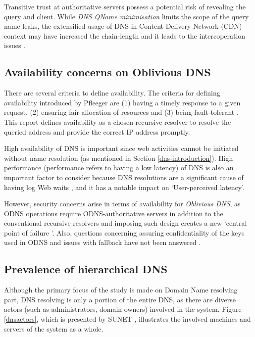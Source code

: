 Transitive trust at authoritative servers possess a potential risk of revealing the query and client. While \textit{DNS QName minimisation} \cite{bortzmeyer2016dns} limits the scope of the query name leaks, the extensified usage of DNS in Content Delivery Network (CDN) context \cite{WANG2018235} may have increased the chain-length and it leads to the intercoperation issues \cite{Huque-QNAME-Min-analysis}.

\subsection{Availability concerns on Oblivious DNS}
There are several criteria to define availability. The criteria for defining availability introduced by Pfleeger are (1) having a timely response to a given request, (2) ensuring fair allocation of resources and (3) being fault-tolerant \cite{securityincomputing}.
This report defines availability as a chosen recursive resolver to resolve the queried address and provide the correct IP address promptly.

High availability of DNS is important since web activities cannot be initiated without name resolution (as mentioned in Section \ref{dns-introduction}). High performance (performance refers to having a low latency) of DNS is also an important factor to consider because DNS resolutions are a significant cause of having log Web waits \cite{cohen2003proactive, jung2002dns}, and it has a notable impact on `User-perceived latency'.

However, security concerns arise in terms of availability for \textit{Oblivious DNS}, as ODNS operations require ODNS-authoritative servers in addition to the conventional recursive resolvers and imposing such design creates a new `central point of failure \cite{minutes-102-dprive}'.
Also, questions concerning assuring confidentiality of the keys used in ODNS and issues with fallback have not been answered \cite{minutes-102-dprive}.

\subsection{Prevalence of hierarchical DNS}
Although the primary focus of the study is made on Domain Name resolving part, DNS resolving is only a portion of the entire DNS, as there are diverse actors (such as administrators, domain owners) involved in the system.
Figure \ref{dnsactors}, which is presented by SUNET \cite{SUNET-DNS}, illustrates the involved machines and servers of the system as a whole.


